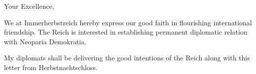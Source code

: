 




\noindent
Your Excellence,

We at Immerherbstreich hereby express our good faith in flourishing international friendship.
The Reich is interested in establishing permanent diplomatic relation with Neoparia Demokratia.

My diplomats shall be delivering the good intentions of the Reich along with this letter from Herbstnachtschloss.


